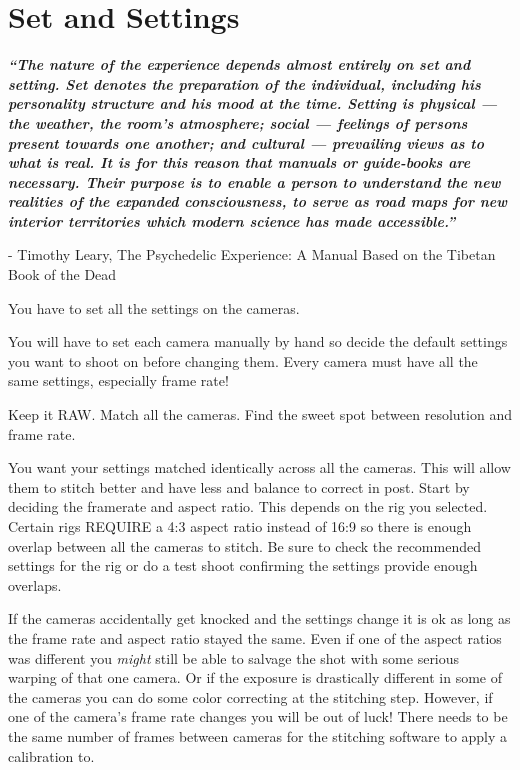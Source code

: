 \chapter{Set and Settings}
\pagecolor{white}
\label{chap:6}
\begin{fullwidth}


{\itshape\bfseries “The nature of the experience depends almost entirely on set and setting. Set denotes the preparation of the individual, including his personality structure and his mood at the time. Setting is physical — the weather, the room’s atmosphere; social — feelings of persons present towards one another; and cultural — prevailing views as to what is real. It is for this reason that manuals or guide-books are necessary. Their purpose is to enable a person to understand the new realities of the expanded consciousness, to serve as road maps for new interior territories which modern science has made accessible.”}

- Timothy Leary, The Psychedelic Experience: A Manual Based on the Tibetan Book of the Dead
\vspace{\baselineskip}

\problem

{\large You have to set all the settings on the cameras. \par}

You will have to set each camera manually by hand so decide the default settings you want to shoot on before changing them. Every camera must have all the same settings, especially frame rate!

\solution

{\large Keep it RAW. Match all the cameras. Find the sweet spot between resolution and frame rate. \par}

You want your settings matched identically across all the cameras. This will allow them to stitch better and have less \textbf{} and balance to correct in post. Start by deciding the framerate and aspect ratio. This depends on the rig you selected. Certain rigs REQUIRE a 4:3 aspect ratio instead of 16:9 so there is enough overlap between all the cameras to stitch. Be sure to check the recommended settings for the rig or do a test shoot confirming the settings provide enough overlaps.

If the cameras accidentally get knocked and the settings change it is ok as long as the frame rate and aspect ratio stayed the same. Even if one of the aspect ratios was different you {\it might} still be able to salvage the shot with some serious warping of that one camera. Or if the exposure is drastically different in some of the cameras you can do some color correcting at the stitching step. However, if one of the camera’s frame rate changes you will be out of luck! There needs to be the same number of frames between cameras for the stitching software to apply a calibration to. 


\end{fullwidth}
